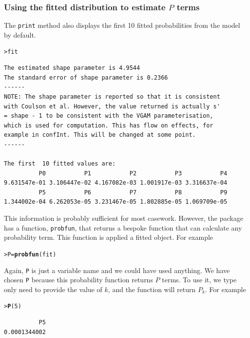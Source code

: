 \documentclass{article}\usepackage[]{graphicx}\usepackage[]{xcolor}
\makeatletter
\newcommand{\hlnum}[1]{\textcolor[rgb]{0.686,0.059,0.569}{#1}}%
\newcommand{\hlstd}[1]{\textcolor[rgb]{0.345,0.345,0.345}{#1}}%
\newcommand{\hlkwb}[1]{\textcolor[rgb]{0.69,0.353,0.396}{#1}}%
\newcommand{\hlkwd}[1]{\textcolor[rgb]{0.737,0.353,0.396}{\textbf{#1}}}%
\newenvironment{kframe}{%
 \def\at@end@of@kframe{}%
 \ifinner\ifhmode%
  \def\at@end@of@kframe{\end{minipage}}%
  \begin{minipage}{\columnwidth}%
 \fi\fi%
 \def\FrameCommand##1{\hskip\@totalleftmargin \hskip-\fboxsep
 \colorbox{shadecolor}{##1}\hskip-\fboxsep
     \hskip-\linewidth \hskip-\@totalleftmargin \hskip\columnwidth}%
 \MakeFramed {\advance\hsize-\width
   \@totalleftmargin\z@ \linewidth\hsize
   \@setminipage}}%
 {\par\unskip\endMakeFramed%
 \at@end@of@kframe}
\newenvironment{knitrout}{}{} %
\newcommand{\rcode}[1]{\lstinline[language=R,basicstyle=\normalsize\ttfamily]!#1!}
\makeatother
\begin{document}
\subsubsection{Using the fitted distribution to estimate $P$ terms}
The \rcode{print} method also displays the first 10 fitted probabilities from the model by default.
\begin{knitrout}
\color{fgcolor}\begin{kframe}
\begin{alltt}
\hlstd{> }\hlstd{fit}
\end{alltt}
\begin{verbatim}
The estimated shape parameter is 4.9544 
The standard error of shape parameter is 0.2366 
------
NOTE: The shape parameter is reported so that it is consistent
with Coulson et al. However, the value returned is actually s'
= shape - 1 to be consistent with the VGAM parameterisation,
which is used for computation. This has flow on effects, for
example in confInt. This will be changed at some point.
------

The first  10 fitted values are:
          P0           P1           P2           P3           P4 
9.631547e-01 3.106447e-02 4.167082e-03 1.001917e-03 3.316637e-04 
          P5           P6           P7           P8           P9 
1.344002e-04 6.262053e-05 3.231467e-05 1.802885e-05 1.069709e-05 
\end{verbatim}
\end{kframe}
\end{knitrout}\noindent
This information is probably sufficient for most casework. However, the package has a function, \rcode{probfun}, that returns a bespoke function that can calculate any probability term. This function is applied a fitted object. For example
\begin{knitrout}
\color{fgcolor}\begin{kframe}
\begin{alltt}
\hlstd{> }\hlstd{P} \hlkwb{=} \hlkwd{probfun}\hlstd{(fit)}
\end{alltt}
\end{kframe}
\end{knitrout}\noindent
Again, \rcode{P} is just a variable name and we could have used anything. We have chosen \rcode{P} because this probability function returns $P$ terms. To use it, we type only need to provide the value of $k$, and the function will return $P_k$. For example
\begin{knitrout}
\color{fgcolor}\begin{kframe}
\begin{alltt}
\hlstd{> }\hlkwd{P}\hlstd{(}\hlnum{5}\hlstd{)}
\end{alltt}
\begin{verbatim}
          P5 
0.0001344002 
\end{verbatim}
\end{kframe}
\end{knitrout}\noindent
\end{document}
